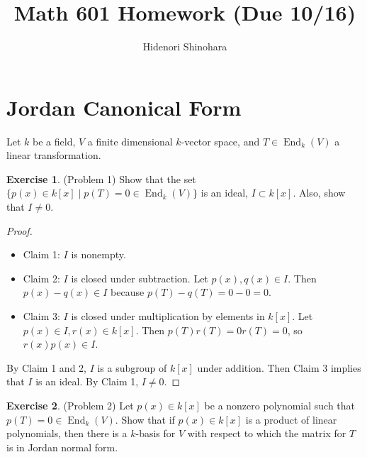 \documentclass[12pt, psamsfonts]{amsart}
\theoremstyle{definition}
\newtheorem*{exer}{Exercise}
\theoremstyle{remark}
\DeclareMathOperator{\End}{End}
\numberwithin{equation}{section}
\begin{document}
\title{Math 601 Homework (Due 10/16)}
\author{Hidenori Shinohara}
\maketitle

\tableofcontents

\section{Jordan Canonical Form}

Let $k$ be a field, $V$ a finite dimensional $k$-vector space, and $T \in \End_k(V)$ a linear transformation.

\begin{exer}{(Problem 1)}
  Show that the set $\{ p(x) \in k[x] \mid p(T) = 0 \in \End_k(V) \}$ is an ideal, $I \subset k[x]$.
  Also, show that $I \ne 0$.
\end{exer}

\begin{proof}
  $ $
  \begin{itemize}
    \item
     Claim 1: $I$ is nonempty.
    \item
     Claim 2: $I$ is closed under subtraction.
     Let $p(x), q(x) \in I$.
     Then $p(x) - q(x) \in I$ because $p(T) - q(T) = 0 - 0 = 0$.
    \item
     Claim 3: $I$ is closed under multiplication by elements in $k[x]$.
     Let $p(x) \in I, r(x) \in k[x]$.
     Then $p(T)r(T) = 0r(T) = 0$, so $r(x)p(x) \in I$.
  \end{itemize}
  By Claim 1 and 2, $I$ is a subgroup of $k[x]$ under addition.
  Then Claim 3 implies that $I$ is an ideal.
  By Claim 1, $I \ne 0$.
\end{proof}

\begin{exer}{(Problem 2)}
  Let $p(x) \in k[x]$ be a nonzero polynomial such that $p(T) = 0 \in \End_k(V)$.
  Show that if $p(x) \in k[x]$ is a product of linear polynomials, then there is a $k$-basis for $V$ with respect to which the matrix for $T$ is in Jordan normal form.
\end{exer}
\end{document}
